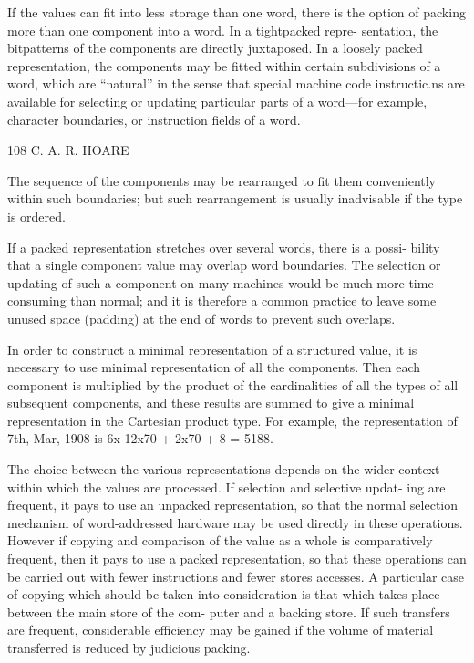 If the values can fit into less storage than one word, there is the option of packing more than one component into a word. In a tightpacked repre- sentation, the bitpatterns of the components are directly juxtaposed. In a loosely packed representation, the components may be fitted within certain subdivisions of a word, which are “natural” in the sense that special machine code instructic.ns are available for selecting or updating particular parts of a word—for example, character boundaries, or instruction fields of a word.

108 C. A. R. HOARE

The sequence of the components may be rearranged to fit them conveniently within such boundaries; but such rearrangement is usually inadvisable if the type is ordered.

If a packed representation stretches over several words, there is a possi- bility that a single component value may overlap word boundaries. The selection or updating of such a component on many machines would be much more time-consuming than normal; and it is therefore a common practice to leave some unused space (padding) at the end of words to prevent such overlaps.

In order to construct a minimal representation of a structured value, it is necessary to use minimal representation of all the components. Then each component is multiplied by the product of the cardinalities of all the types of all subsequent components, and these results are summed to give a minimal representation in the Cartesian product type. For example, the representation of 7th, Mar, 1908 is 6x 12x70 + 2x70 + 8 = 5188.

The choice between the various representations depends on the wider context within which the values are processed. If selection and selective updat- ing are frequent, it pays to use an unpacked representation, so that the normal selection mechanism of word-addressed hardware may be used directly in these operations. However if copying and comparison of the value as a whole is comparatively frequent, then it pays to use a packed representation, so that these operations can be carried out with fewer instructions and fewer stores accesses. A particular case of copying which should be taken into consideration is that which takes place between the main store of the com- puter and a backing store. If such transfers are frequent, considerable efficiency may be gained if the volume of material transferred is reduced by judicious packing.

